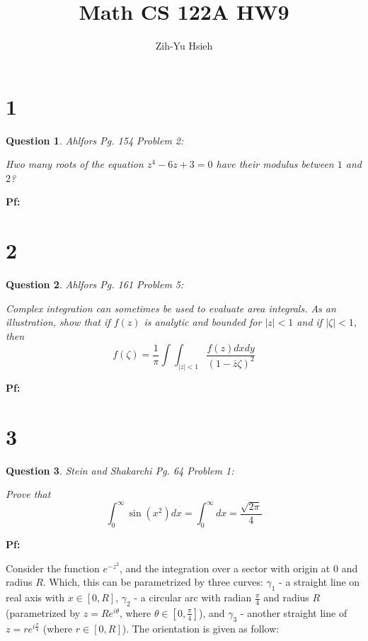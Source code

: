 \documentclass{article}
\title{Math CS 122A HW9}
\author{Zih-Yu Hsieh}
\newtheorem{question}{Question}
\begin{document}
\maketitle

\section*{1}
\begin{myBox}[]{}
    \begin{question}
        Ahlfors Pg. 154 Problem 2:

        Hwo many roots of the equation $z^4-6z+3=0$ have their modulus between $1$ and $2$?
    \end{question}
\end{myBox}

\textbf{Pf:}

\break

\section*{2}
\begin{myBox}[]{}
    \begin{question}
        Ahlfors Pg. 161 Problem 5:

        Complex integration can sometimes be used to evaluate area integrals. 
        As an illustration, show that if $f(z)$ is analytic and bounded for $|z|<1$ and if $|\zeta|<1$, then
        $$f(\zeta)=\frac{1}{\pi}\int\int_{|z|<1}\frac{f(z)dxdy}{(1-\bar{z}\zeta)^2}$$
    \end{question}
\end{myBox}

\textbf{Pf:}

\break

\section*{3}
\begin{myBox}[]{}
    \begin{question}
        Stein and Shakarchi Pg. 64 Problem 1:

        Prove that
        $$\int_{0}^{\infty}\sin(x^2)dx = \int_{0}^{\infty}dx = \frac{\sqrt{2\pi}}{4}$$
    \end{question}
\end{myBox}

\textbf{Pf:}

Consider the function $e^{-z^2}$, and the integration over a sector with origin at $0$ and radius $R$.
Which, this can be parametrized by three curves: $\gamma_1$ - a straight line on real axis with $x\in[0,R]$, 
$\gamma_2$ - a circular arc with radian $\frac{\pi}{4}$ and radius $R$ (parametrized by $z=Re^{i\theta}$, where $\theta\in [0,\frac{\pi}{4}]$),
and $\gamma_3$ - another straight line of $z=re^{i\frac{\pi}{4}}$ (where $r\in [0,R]$). The orientation is given as follow:
\end{document}
